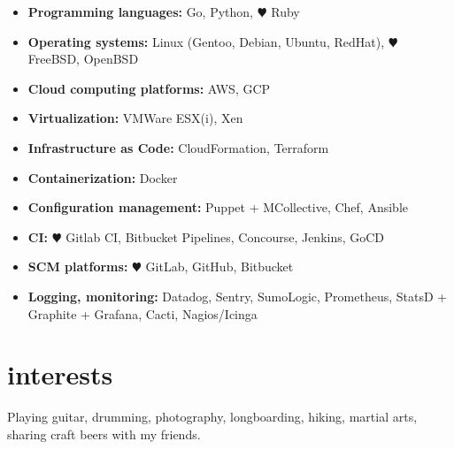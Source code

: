 \documentclass[]{friggeri-cv}
\begin{document}
\begin{itemize}
  \item \textbf{Programming languages:}
        Go, Python, {\color{red} $\varheartsuit$} Ruby
  \item \textbf{Operating systems:}
        Linux (Gentoo, Debian, Ubuntu, RedHat), {\color{red} $\varheartsuit$} FreeBSD, OpenBSD
  \item \textbf{Cloud computing platforms:}
        AWS, GCP
  \item \textbf{Virtualization:}
        VMWare ESX(i), Xen
  \item \textbf{Infrastructure as Code:}
        CloudFormation, Terraform
  \item \textbf{Containerization:}
        Docker
  \item \textbf{Configuration management:}
        Puppet + MCollective, Chef, Ansible
  \item \textbf{CI:}
        {\color{red} $\varheartsuit$} Gitlab CI, Bitbucket Pipelines, Concourse, Jenkins, GoCD
  \item \textbf{SCM platforms:}
        {\color{red} $\varheartsuit$} GitLab, GitHub, Bitbucket
  \item \textbf{Logging, monitoring:}
        Datadog, Sentry, SumoLogic, Prometheus, StatsD + Graphite + Grafana,
        Cacti, Nagios/Icinga
\end{itemize}



\section{interests}

Playing guitar, drumming, photography, longboarding, hiking, martial arts,
sharing craft beers with my friends.
\end{document}
